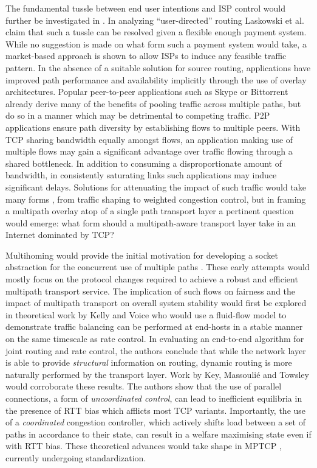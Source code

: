 The fundamental tussle between end user intentions and \ac{ISP} control would further be investigated in \cite{Laskowski:2008p244}.
In analyzing ``user-directed'' routing Laskowski et al. claim that such a tussle can be resolved given a flexible enough payment system.
While no suggestion is made on what form such a payment system would take, a market-based approach is shown to allow \acp{ISP} to induce any feasible traffic pattern.
In the absence of a suitable solution for source routing, applications have improved path performance and availability implicitly through the use of overlay architectures.
Popular peer-to-peer applications such as Skype or Bittorrent already derive many of the benefits of pooling traffic across multiple paths, but do so in a manner which may be detrimental to competing traffic.
\ac{P2P} applications ensure path diversity by establishing flows to multiple peers.
With \ac{TCP} sharing bandwidth equally amongst flows, an application making use of multiple flows may gain a significant advantage over traffic flowing through a shared bottleneck.
In addition to consuming a disproportionate amount of bandwidth, in consistently saturating links such applications may induce significant delays.
Solutions for attenuating the impact of such traffic would take many forms \cite{Peterson:2009p178}, from traffic shaping to weighted congestion control, but in framing a multipath overlay atop of a single path transport layer a pertinent question would emerge: what form should a multipath-aware transport layer take in an Internet dominated by \ac{TCP}?

Multihoming would provide the initial motivation for developing a socket abstraction for the concurrent use of multiple paths \cite{Huitema:1995p543,Hsieh:2002p538,Iyengar:2006p542}.
These early attempts would mostly focus on the protocol changes required to achieve a robust and efficient multipath transport service.
The implication of such flows on fairness and the impact of multipath transport on overall system stability would first be explored in theoretical work by Kelly and Voice \cite{Kelly:2005p140} who would use a fluid-flow model to demonstrate traffic balancing can be performed at end-hosts in a stable manner on the same timescale as rate control.
In evaluating an end-to-end algorithm for joint routing and rate control, the authors conclude that while the network layer is able to provide \emph{structural} information on routing, dynamic routing is more naturally performed by the transport layer.
Work by Key, Massouli\'{e} and Towsley \cite{Key:2007p130} would corroborate these results. 
The authors show that the use of parallel connections, a form of \emph{uncoordinated control}, can lead to inefficient equilibria in the presence of \ac{RTT} bias which afflicts most \ac{TCP} variants. Importantly, the use of a \emph{coordinated} congestion controller, which actively shifts load between a set of paths in accordance to their state, can result in a welfare maximising state even if with \ac{RTT} bias.
These theoretical advances would take shape in \ac{MPTCP} \cite{Wischik:2011p540}, currently undergoing standardization.

